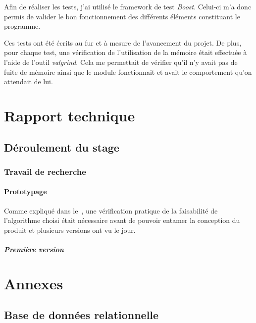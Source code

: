 \documentclass[a4paper,10pt, twoside]{report}
\begin{document}
\begin{spacing}{1.2}
Afin de r\'ealiser les tests, j'ai utilis\'e le framework de test
\textit{Boost}. Celui-ci m'a donc permis de valider le bon fonctionnement des
diff\'erents \'el\'ements constituant le programme.

Ces tests ont \'et\'e \'ecrits au fur et \`a mesure de l'avancement du projet.
De plus, pour chaque test, une v\'erification de l'utilisation de la m\'emoire
\'etait effectu\'ee \`a l'aide de l'outil \textit{valgrind}. Cela me permettait
de v\'erifier qu'il n'y avait pas de fuite de m\'emoire ainsi que le module
fonctionnait et avait le comportement qu'on attendait de lui.


\part{Rapport technique}
\label{rapportTechnique}
\setcounter{chapter}{0}
\chapter{D\'eroulement du stage}
\thispagestyle{fancy}
\section{Travail de recherche}
\subsection{Prototypage}
Comme expliqu\'e dans le~, une v\'erification pratique
de la faisabilit\'e de l'algorithme choisi \'etait n\'ecessaire avant de
pouvoir entamer la conception du produit et plusieurs versions ont vu le jour.

\subsubsection{Premi\`ere version}



\newpage
\listoffigures
\listoftables



\appendix
\makeatletter
\def\@seccntformat#1{Annexe~\csname the#1\endcsname:\quad}
\makeatother
\part{Annexes}
\chapter{Base de donn\'ees relationnelle}
\thispagestyle{fancy}
\label{annBDR}
\thispagestyle{fancy}

\end{spacing}
\end{document}
